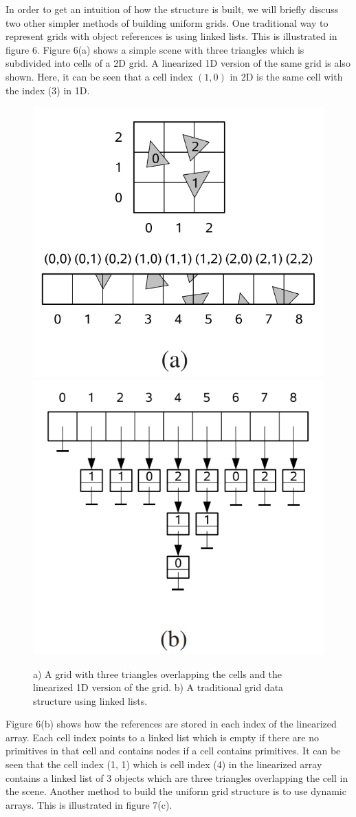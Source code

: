 \documentclass[11pt,a4paper]{article}
\begin{document}
In order to get an intuition of how the structure is built, we will briefly discuss two other simpler methods of building uniform grids. One traditional way to represent grids with object references is using linked lists. This is illustrated in figure 6. Figure 6(a) shows a simple scene with three triangles which is subdivided into cells of a 2D grid. A linearized 1D version of the same grid is also shown. Here, it can be seen that a cell index $(1, 0)$ in 2D is the same cell with the index (3) in 1D.
\begin{figure}[H]
	\centering
	\captionsetup{justification=centering}
	\includegraphics[width=.28\textwidth]{uniformgrids1}\quad
	\includegraphics[width=.28\textwidth]{uniformgrids2}\quad
	\caption{a) A grid with three triangles overlapping the cells and the linearized 1D version of the grid. b) A traditional grid data structure using linked lists. \protect\cite{lagae2008compact}}
\end{figure}
Figure 6(b) shows how the references are stored in each index of the linearized array. Each cell index points to a linked list which is empty if there are no primitives in that cell and contains nodes if a cell contains primitives. It can be seen that the cell index (1, 1) which is cell index (4) in the linearized array contains a linked list of 3 objects which are three triangles overlapping the cell in the scene. Another method to build the uniform grid structure is to use dynamic arrays. This is illustrated in figure 7(c).
\end{document}
